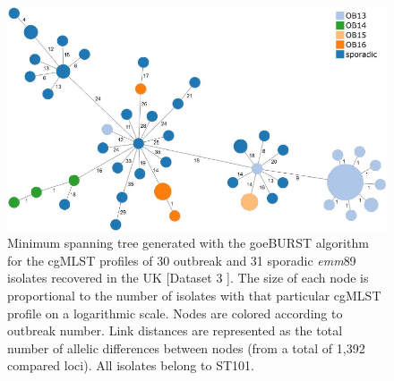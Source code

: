 \newpage
\begin{figure}[!ht]
    \centering
    \includegraphics[angle=0,width=\textwidth]{figures/chapter 4/FigureS13.pdf}
    \caption[Minimum spanning tree generated with the goeBURST algorithm for the cgMLST profiles of 30 outbreak and 31 sporadic \textit{emm}89 isolates recovered in the UK.]{Minimum spanning tree generated with the goeBURST algorithm for the \ac{cgMLST} profiles of 30 outbreak and 31 sporadic \textit{emm}89 isolates recovered in the UK \cite{coelho_genomic_2019} [Dataset 3 \cite{friaes_supplemental_2023}]. The size of each node is proportional to the number of isolates with that particular \ac{cgMLST} profile on a logarithmic scale. Nodes are colored according to outbreak number. Link distances are represented as the total number of allelic differences between nodes (from a total of 1,392 compared loci). All isolates belong to \ac{ST}101.}
    \label{fig:chap4_figureS13}
\end{figure}

